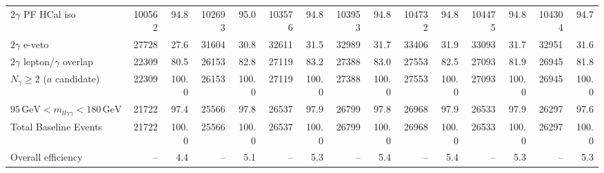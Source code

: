 \begin{table}[htbp]
{\begin{tabular}{lrrrrrrrrrrrrrr}
$2\gamma$ PF HCal iso & 100562 & 94.8 & 102693 & 95.0 & 103576 & 94.8 & 103953 & 94.8 & 104732 & 94.8 & 104475 & 94.8 & 104304 & 94.7 \\
$2\gamma$ e-veto & 27728 & 27.6 & 31604 & 30.8 & 32611 & 31.5 & 32989 & 31.7 & 33406 & 31.9 & 33093 & 31.7 & 32951 & 31.6 \\
$2\gamma$ lepton/$\gamma$ overlap & 22309 & 80.5 & 26153 & 82.8 & 27119 & 83.2 & 27388 & 83.0 & 27553 & 82.5 & 27093 & 81.9 & 26945 & 81.8 \\
$N_{\gamma}\geq 2$ ($a$ candidate) & 22309 & 100.0 & 26153 & 100.0 & 27119 & 100.0 & 27388 & 100.0 & 27553 & 100.0 & 27093 & 100.0 & 26945 & 100.0 \\
$95\,\mathrm{GeV} < m_{ll\gamma\gamma} < 180\,\mathrm{GeV}$ & 21722 & 97.4 & 25566 & 97.8 & 26537 & 97.9 & 26799 & 97.8 & 26968 & 97.9 & 26533 & 97.9 & 26297 & 97.6 \\
Total Baseline Events & 21722 & 100.0 & 25566 & 100.0 & 26537 & 100.0 & 26799 & 100.0 & 26968 & 100.0 & 26533 & 100.0 & 26297 & 100.0 \\
\hline
Overall efficiency & -- & 4.4 & -- & 5.1 & -- & 5.3 & -- & 5.4 & -- & 5.4 & -- & 5.3 & -- & 5.3 \\
\hline
\end{tabular}%
}
\end{table}

